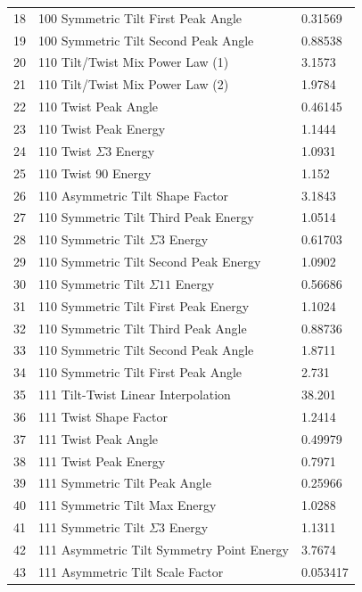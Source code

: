 \documentclass[12pt]{report}
\begin{document}
\begin{longtable}{r l l}
18 & \textlangle{}100\textrangle{} Symmetric Tilt First Peak Angle & 0.31569 \\
19 & \textlangle{}100\textrangle{} Symmetric Tilt Second Peak Angle & 0.88538 \\
20 & \textlangle{}110\textrangle{} Tilt/Twist Mix Power Law (1) & 3.1573 \\
21 & \textlangle{}110\textrangle{} Tilt/Twist Mix Power Law (2) & 1.9784 \\
22 & \textlangle{}110\textrangle{} Twist Peak Angle & 0.46145 \\
23 & \textlangle{}110\textrangle{} Twist Peak Energy & 1.1444 \\
24 & \textlangle{}110\textrangle{} Twist $\Sigma3$ Energy & 1.0931 \\
25 & \textlangle{}110\textrangle{} Twist 90\textdegree{} Energy & 1.152 \\
26 & \textlangle{}110\textrangle{} Asymmetric Tilt Shape Factor & 3.1843 \\
27 & \textlangle{}110\textrangle{} Symmetric Tilt Third Peak Energy & 1.0514 \\
28 & \textlangle{}110\textrangle{} Symmetric Tilt $\Sigma3$ Energy & 0.61703 \\
29 & \textlangle{}110\textrangle{} Symmetric Tilt Second Peak Energy & 1.0902 \\
30 & \textlangle{}110\textrangle{} Symmetric Tilt $\Sigma11$ Energy & 0.56686 \\
31 & \textlangle{}110\textrangle{} Symmetric Tilt First Peak Energy & 1.1024 \\
32 & \textlangle{}110\textrangle{} Symmetric Tilt Third Peak Angle & 0.88736 \\
33 & \textlangle{}110\textrangle{} Symmetric Tilt Second Peak Angle & 1.8711 \\
34 & \textlangle{}110\textrangle{} Symmetric Tilt First Peak Angle & 2.731 \\
35 & \textlangle{}111\textrangle{} Tilt-Twist Linear Interpolation & 38.201 \\
36 & \textlangle{}111\textrangle{} Twist Shape Factor & 1.2414 \\
37 & \textlangle{}111\textrangle{} Twist Peak Angle & 0.49979 \\
38 & \textlangle{}111\textrangle{} Twist Peak Energy & 0.7971 \\
39 & \textlangle{}111\textrangle{} Symmetric Tilt Peak Angle & 0.25966 \\
40 & \textlangle{}111\textrangle{} Symmetric Tilt Max Energy & 1.0288 \\
41 & \textlangle{}111\textrangle{} Symmetric Tilt $\Sigma3$ Energy & 1.1311 \\
42 & \textlangle{}111\textrangle{} Asymmetric Tilt Symmetry Point Energy & 3.7674 \\
43 & \textlangle{}111\textrangle{} Asymmetric Tilt Scale Factor & 0.053417 \\
\end{longtable}
\end{document}
